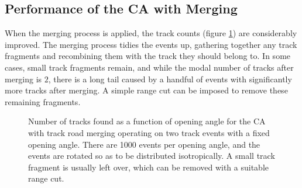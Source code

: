 \subsection{Performance of the \acl{CA} with Merging}
When the merging process is applied, the track counts (figure \ref{fig:ca_toy_merged_trackcounts}) %
are considerably improved. The merging process tidies the events up, gathering together any track fragments and recombining them with the track they should belong to. In some cases, small track fragments remain, and while the modal number of tracks after merging is $2$, there is a long tail caused by a handful of events with significantly more tracks after merging. A simple range cut can be imposed to remove these remaining fragments.

\begin{figure}
\centering
\caption[Track count as a function of angle for CA with merging operating on toy MC events]{\label{fig:ca_toy_merged_trackcounts}Number of tracks found as a function of opening angle for the \ac{CA} with track road merging operating on two track events with a fixed opening angle. There are 1000 events per opening angle, and the events are rotated so as to be distributed isotropically. A small track fragment is usually left over, which can be removed with a suitable range cut.}
\end{figure}

